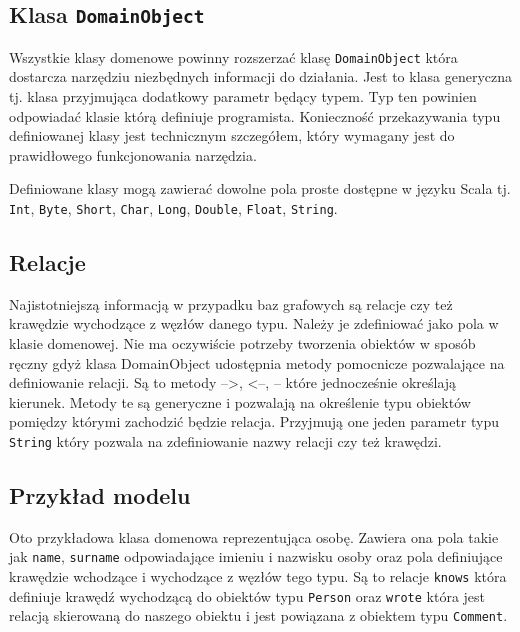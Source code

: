\documentclass[brudnopis]{xmgr}
\begin{document}
\subsection{Klasa \texttt{DomainObject}}

Wszystkie klasy domenowe powinny rozszerzać klasę \texttt{DomainObject} która dostarcza narzędziu niezbędnych informacji do działania. Jest to klasa generyczna tj. klasa przyjmująca dodatkowy parametr będący typem. Typ ten powinien odpowiadać klasie którą definiuje programista. Konieczność przekazywania typu definiowanej klasy jest technicznym szczegółem, który wymagany jest do prawidłowego funkcjonowania narzędzia.

Definiowane klasy mogą zawierać dowolne pola proste dostępne w języku Scala tj. \texttt{Int}, \texttt{Byte}, \texttt{Short}, \texttt{Char}, \texttt{Long}, \texttt{Double}, \texttt{Float}, \texttt{String}.

\subsection{Relacje}

Najistotniejszą informacją w przypadku baz grafowych są relacje czy też krawędzie wychodzące z węzłów danego typu. Należy je zdefiniować jako pola w klasie domenowej. Nie ma oczywiście potrzeby tworzenia obiektów w sposób ręczny gdyż klasa DomainObject udostępnia metody pomocnicze pozwalające na definiowanie relacji. Są to metody  -->, <--, -- które jednocześnie określają kierunek. Metody te są generyczne i pozwalają na określenie typu obiektów pomiędzy którymi zachodzić będzie relacja. Przyjmują one jeden parametr typu \texttt{String} który pozwala na zdefiniowanie nazwy relacji czy też krawędzi.

\subsection{Przykład modelu}

Oto przykładowa klasa domenowa reprezentująca osobę. Zawiera ona pola takie jak \texttt{name}, \texttt{surname} odpowiadające imieniu i nazwisku osoby oraz pola definiujące krawędzie wchodzące i wychodzące z węzłów tego typu. Są to relacje \texttt{knows} która definiuje krawędź wychodzącą do obiektów typu \texttt{Person} oraz \texttt{wrote} która jest relacją skierowaną do naszego obiektu i jest powiązana z obiektem typu \texttt{Comment}.

\inputminted{scala}{listings/scala/dsl/sample-model.scala}
\end{document}
